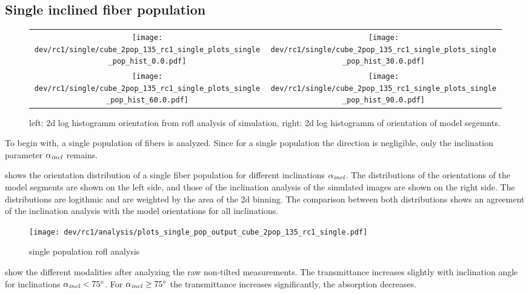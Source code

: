 \subsection{Single inclined fiber population}
% 
\begin{figure}[!tp]
\centering
\newlength{\width}
\setlength{\width}{0.45\textwidth}
\begin{tabular}{c|c}
    \texttt{[image: dev/rc1/single/cube\_2pop\_135\_rc1\_single\_plots\_single\_pop\_hist\_0.0.pdf]}&
    \texttt{[image: dev/rc1/single/cube\_2pop\_135\_rc1\_single\_plots\_single\_pop\_hist\_30.0.pdf]}\\ 
    \texttt{[image: dev/rc1/single/cube\_2pop\_135\_rc1\_single\_plots\_single\_pop\_hist\_60.0.pdf]}&
    \texttt{[image: dev/rc1/single/cube\_2pop\_135\_rc1\_single\_plots\_single\_pop\_hist\_90.0.pdf]}
\end{tabular}
% 
\caption[sim]{left: 2d log histogramm orientation from rofl analysis of simulation, right: 2d log histogramm of orientation of model segemnts. }
\label{fig:single_fiber_pop_hist}
\end{figure}
% 
To begin with, a single population of fibers is analyzed.
Since for a single population the direction is negligible, only the inclination parameter $\textnormal{$\alpha_{\mathit{incl}}$}{}$ remains.
\par
% 
 shows the orientation distribution of a single fiber population for different inclinations $\textnormal{$\alpha_{\mathit{incl}}$}{}$.
The distributions of the orientations of the model segments are shown on the left side, and those of the inclination analysis of the simulated images are shown on the right side.
The distributions are logithmic and are weighted by the area of the 2d binning.
The comparison between both distributions shows an agreement of the inclination analysis with the model orientations for all inclinations.
\par
% 
% 
% 
\begin{figure}[!p]
\centering
\texttt{[image: dev/rc1/analysis/plots\_single\_pop\_output\_cube\_2pop\_135\_rc1\_single.pdf]}
\caption[]{single population rofl analysis}
\label{fig:single_fiber_pop_rofl}
\end{figure}
% 
 show the different modalities after analyzing the raw non-tilted measurements.
The transmittance increases slightly with inclination angle for inclinations $\textnormal{$\alpha_{\mathit{incl}}$}<\SI{75}{\degree}$.
For $\textnormal{$\alpha_{\mathit{incl}}$} \ge \SI{75}{\degree}$ the transmittance increases significantly, \ie{} the absorption decreases.
